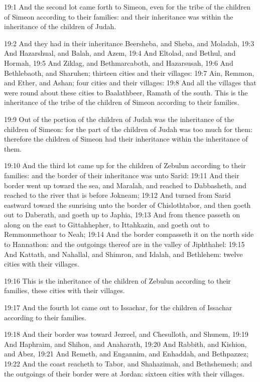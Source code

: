 19:1 And the second lot came forth to Simeon, even for the tribe of the children of Simeon according to their families: and their inheritance was within the inheritance of the children of Judah.

19:2 And they had in their inheritance Beersheba, and Sheba, and Moladah, 19:3 And Hazarshual, and Balah, and Azem, 19:4 And Eltolad, and Bethul, and Hormah, 19:5 And Ziklag, and Bethmarcaboth, and Hazarsusah, 19:6 And Bethlebaoth, and Sharuhen; thirteen cities and their villages: 19:7 Ain, Remmon, and Ether, and Ashan; four cities and their villages: 19:8 And all the villages that were round about these cities to Baalathbeer, Ramath of the south. This is the inheritance of the tribe of the children of Simeon according to their families.

19:9 Out of the portion of the children of Judah was the inheritance of the children of Simeon: for the part of the children of Judah was too much for them: therefore the children of Simeon had their inheritance within the inheritance of them.

19:10 And the third lot came up for the children of Zebulun according to their families: and the border of their inheritance was unto Sarid: 19:11 And their border went up toward the sea, and Maralah, and reached to Dabbasheth, and reached to the river that is before Jokneam; 19:12 And turned from Sarid eastward toward the sunrising unto the border of Chislothtabor, and then goeth out to Daberath, and goeth up to Japhia, 19:13 And from thence passeth on along on the east to Gittahhepher, to Ittahkazin, and goeth out to Remmonmethoar to Neah; 19:14 And the border compasseth it on the north side to Hannathon: and the outgoings thereof are in the valley of Jiphthahel: 19:15 And Kattath, and Nahallal, and Shimron, and Idalah, and Bethlehem: twelve cities with their villages.

19:16 This is the inheritance of the children of Zebulun according to their families, these cities with their villages.

19:17 And the fourth lot came out to Issachar, for the children of Issachar according to their families.

19:18 And their border was toward Jezreel, and Chesulloth, and Shunem, 19:19 And Haphraim, and Shihon, and Anaharath, 19:20 And Rabbith, and Kishion, and Abez, 19:21 And Remeth, and Engannim, and Enhaddah, and Bethpazzez; 19:22 And the coast reacheth to Tabor, and Shahazimah, and Bethshemesh; and the outgoings of their border were at Jordan: sixteen cities with their villages.

